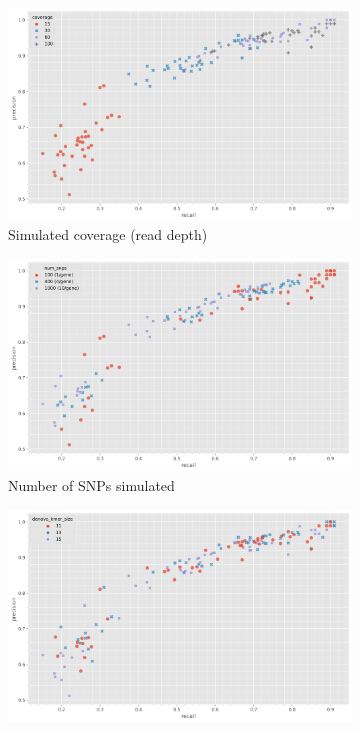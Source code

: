 \begin{figure}
     \centering
     \begin{subfigure}[b]{0.475\textwidth}
        \includegraphics[width=1\linewidth]{Chapter1/Figs/denovo_precrec_covg.png}
        \centering
        \caption{Simulated coverage (read depth)}
        \label{fig:denovo-sims-covg}
     \end{subfigure}
     \begin{subfigure}[b]{0.475\textwidth}
         \centering
        \includegraphics[width=1\linewidth]{Chapter1/Figs/denovo_precrec_num_snps.png}
         \caption{Number of SNPs simulated}
         \label{fig:denovo-sims-num-snps}
     \end{subfigure}
     \begin{subfigure}[b]{0.475\textwidth}
        \includegraphics[width=1\linewidth]{Chapter1/Figs/denovo_precrec_kmer.png}

\end{subfigure}
\end{figure}
